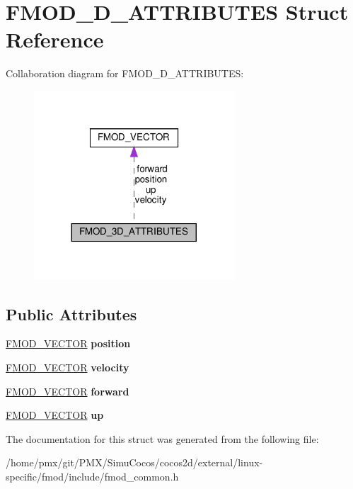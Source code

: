 \hypertarget{structFMOD__3D__ATTRIBUTES}{}\section{F\+M\+O\+D\+\_\+D\+\_\+\+A\+T\+T\+R\+I\+B\+U\+T\+ES Struct Reference}
\label{structFMOD__3D__ATTRIBUTES}


Collaboration diagram for F\+M\+O\+D\+\_\+D\+\_\+\+A\+T\+T\+R\+I\+B\+U\+T\+ES\+:
\nopagebreak
\begin{figure}[H]
\begin{center}
\leavevmode
\includegraphics[width=212pt]{structFMOD__3D__ATTRIBUTES__coll__graph}
\end{center}
\end{figure}
\subsection*{Public Attributes}
\begin{DoxyCompactItemize}
\item 
\mbox{\label{structFMOD__3D__ATTRIBUTES_a66d34f6da546c09f55077b454987ac48}} 
\hyperlink{structFMOD__VECTOR}{F\+M\+O\+D\+\_\+\+V\+E\+C\+T\+OR} {\bfseries position}
\item 
\mbox{\label{structFMOD__3D__ATTRIBUTES_a1590142763b7d82eca72bf3d559bd28f}} 
\hyperlink{structFMOD__VECTOR}{F\+M\+O\+D\+\_\+\+V\+E\+C\+T\+OR} {\bfseries velocity}
\item 
\mbox{\label{structFMOD__3D__ATTRIBUTES_a7e9c254f5d13e496d678826c262eac7d}} 
\hyperlink{structFMOD__VECTOR}{F\+M\+O\+D\+\_\+\+V\+E\+C\+T\+OR} {\bfseries forward}
\item 
\mbox{\label{structFMOD__3D__ATTRIBUTES_aaac3d8ed834651afa60b4bcb84b2c7d1}} 
\hyperlink{structFMOD__VECTOR}{F\+M\+O\+D\+\_\+\+V\+E\+C\+T\+OR} {\bfseries up}
\end{DoxyCompactItemize}


The documentation for this struct was generated from the following file\+:\begin{DoxyCompactItemize}
\item 
/home/pmx/git/\+P\+M\+X/\+Simu\+Cocos/cocos2d/external/linux-\/specific/fmod/include/fmod\+\_\+common.\+h\end{DoxyCompactItemize}

